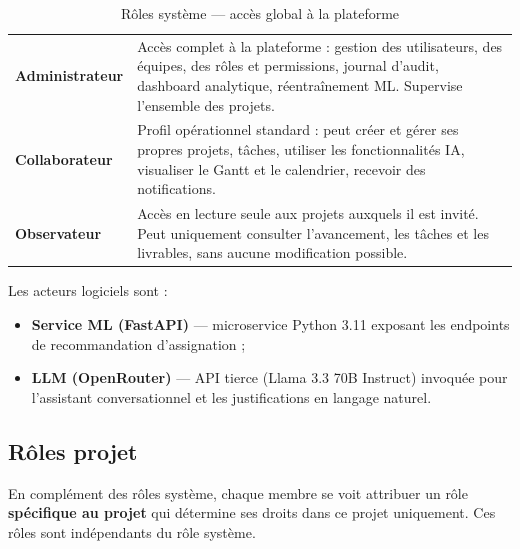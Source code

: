 \begin{table}[H]
  \centering
  \caption{Rôles système — accès global à la plateforme}
  \label{tab:roles_sys}
  \begin{tabularx}{\textwidth}{L{3cm}X}
    \toprule
     &  \\
    \midrule
    \textbf{Administrateur} & Accès complet à la plateforme : gestion des
      utilisateurs, des équipes, des rôles et permissions, journal d'audit,
      dashboard analytique, réentraînement ML. Supervise l'ensemble des projets. \\
    \textbf{Collaborateur} & Profil opérationnel standard : peut créer et gérer
      ses propres projets, tâches, utiliser les fonctionnalités IA, visualiser
      le Gantt et le calendrier, recevoir des notifications. \\
    \textbf{Observateur} & Accès en lecture seule aux projets auxquels il est
      invité. Peut uniquement consulter l'avancement, les tâches et les livrables,
      sans aucune modification possible. \\
    \bottomrule
  \end{tabularx}
\end{table}

Les acteurs logiciels sont :
\begin{itemize}
  \item \textbf{Service ML (FastAPI)} — microservice Python 3.11 exposant les
        endpoints de recommandation d'assignation ;
  \item \textbf{LLM (OpenRouter)} — API tierce (Llama 3.3 70B Instruct) invoquée
        pour l'assistant conversationnel et les justifications en langage naturel.
\end{itemize}

\subsection{Rôles projet}

En complément des rôles système, chaque membre se voit attribuer un rôle
\textbf{spécifique au projet} qui détermine ses droits dans ce projet uniquement.
Ces rôles sont indépendants du rôle système.

